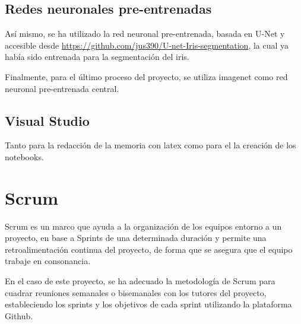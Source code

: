 \subsection{Redes neuronales pre-entrenadas}

Así mismo, se ha utilizado la red neuronal pre-entrenada, basada en U-Net y accesible desde \url{https://github.com/jus390/U-net-Iris-segmentation}, la cual ya había sido
entrenada para la segmentación del iris.

Finalmente, para el último proceso del proyecto, se utiliza imagenet como red neuronal pre-entrenada central.

\subsection{Visual Studio}

Tanto para la redacción de la memoria con latex como para el la creación de los notebooks.

\section{Scrum}
Scrum es un marco que ayuda a la organización de los equipos entorno a un proyecto, en base a Sprints de una determinada duración y permite una retroalimentación
continua del proyecto, de forma que se asegura que el equipo trabaje en consonancia.

En el caso de este proyecto, se ha adecuado la metodología de Scrum para cuadrar reuniones semanales o bisemanales con los tutores del proyecto, estableciendo
los sprints y los objetivos de cada sprint utilizando la plataforma Github.





